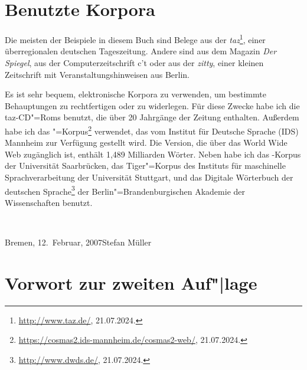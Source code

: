 \section*{Benutzte Korpora}

Die meisten der Beispiele in diesem Buch sind Belege aus der {\em taz}\footnote{
\url{http://www.taz.de/}, 21.07.2024.}, einer überregionalen
deutschen Tageszeitung. Andere sind aus dem Magazin \emph{Der Spiegel},
aus der Computerzeitschrift c't oder aus der \emph{zitty}, einer kleinen Zeitschrift mit
Veranstaltungshinweisen aus Berlin. 


Es ist sehr bequem, elektronische Korpora zu verwenden, um bestimmte Behauptungen zu rechtfertigen
oder zu widerlegen.
Für diese Zwecke habe ich die taz-CD"=Roms benutzt, die über 20 Jahrgänge der Zeitung enthalten.
Außerdem habe ich das \cosmas"=Korpus\footnote{\url{https://cosmas2.ids-mannheim.de/cosmas2-web/}, 21.07.2024.} 
verwendet, das vom Institut für Deutsche Sprache (IDS) Mannheim zur Verfügung gestellt
wird. Die Version, die über das World Wide Web zugänglich ist, enthält 1,489 Milliarden Wörter.
Neben \cosmas habe ich das \negra{}\hyp Korpus der Universität Saarbrücken,
das Tiger"=Korpus des Instituts für maschinelle Sprachverarbeitung der Universität Stuttgart,
und das Digitale Wörterbuch der deutschen Sprache\footnote{\url{http://www.dwds.de/}, 21.07.2024.} der 
Berlin"=Brandenburgischen Akademie der Wissenschaften benutzt.

~\medskip

\noindent
Bremen, 12.\ Februar, 2007\hfill Stefan Müller

\section*{Vorwort zur zweiten Auf"|lage}

